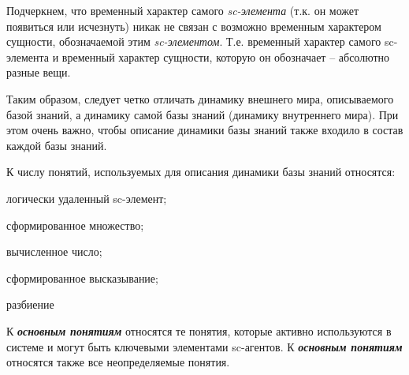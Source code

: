 Подчеркнем, что временный характер самого \textit{sc-элемента} (т.к. он может появиться или исчезнуть) никак не связан с возможно временным характером сущности, обозначаемой этим \textit{sc-элементом}. Т.е. временный характер самого sc-элемента и временный характер сущности, которую он обозначает -- абсолютно разные вещи.

Таким образом, следует четко отличать динамику внешнего мира, описываемого базой знаний, а динамику самой базы знаний (динамику внутреннего мира). При этом очень важно, чтобы описание динамики базы знаний также входило в состав каждой базы знаний.

К числу понятий, используемых для описания динамики базы знаний относятся:
\begin{textitemize}
	\item логически удаленный sc-элемент;
	\item сформированное множество;
	\item вычисленное число;
	\item сформированное высказывание;
\end{textitemize}

\begin{SCn}

\begin{scnreltoset}{разбиение}
\end{scnreltoset}




\end{SCn}

К \textbf{\textit{основным понятиям}} относятся те понятия, которые активно используются в системе и могут быть ключевыми элементами sc-агентов. К \textbf{\textit{основным понятиям}} относятся также все неопределяемые понятия.

\begin{SCn}
\end{SCn}

